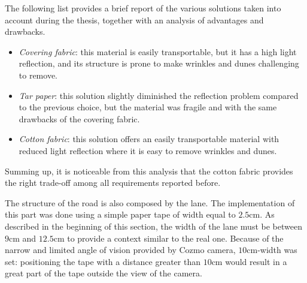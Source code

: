 The following list provides a brief report of the various solutions taken into account during the thesis, together with an analysis of advantages and drawbacks.

\begin{itemize}
	\item \textit{Covering fabric}: this material is easily transportable, but it has a high light reflection, and its structure is prone to make wrinkles and dunes challenging to remove.
	\item \textit{Tar paper}: this solution slightly diminished the reflection problem compared to the previous choice, but the material was fragile and with the same drawbacks of the covering fabric.
	\item \textit{Cotton fabric}: this solution offers an easily  transportable material with reduced light reflection where it is easy to remove wrinkles and dunes.
\end{itemize}

Summing up, it is noticeable from this analysis that the cotton fabric provides the right trade-off among all requirements reported before.

The structure of the road is also composed by the lane.
The implementation of this part was done using a simple paper tape of width equal to $2.5$cm. As described in the beginning of this section, the width of the lane must be between $9$cm and $12.5$cm to provide a context similar to the real one. Because of the narrow and limited angle of vision provided by Cozmo camera, $10$cm-width was set: positioning the tape with a distance greater than $10$cm would result in a great part of the tape outside the view of the camera.